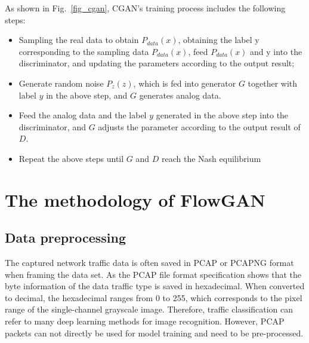 \documentclass[conference]{IEEEtran}
\begin{document}
As shown in Fig.~\ref{fig_cgan}, CGAN's training process includes the following steps:
\begin{itemize}
\item Sampling the real data to obtain $P_{data}(x)$, obtaining the label y corresponding to the sampling data $P_{data}(x)$, feed $P_{data}(x)$ and y into the discriminator, and updating the parameters according to the output result;
\item Generate random noise $P_z(z)$, which is fed into generator $G$ together with label $y$ in the above step, and $G$ generates analog data.
\item Feed the analog data and the label $y$ generated in the above step into the discriminator, and $G$ adjusts the parameter according to the output result of $D$.
\item Repeat the above steps until $G$ and $D$ reach the Nash equilibrium
\end{itemize}

\section{The methodology of FlowGAN}\label{algorithm}
\subsection{Data preprocessing}\label{data_preprocess}
The captured network traffic data is often saved in PCAP or PCAPNG format when framing the data set. As the PCAP file format specification shows that the byte information of the data traffic type is saved in hexadecimal. When converted to decimal, the hexadecimal ranges from 0 to 255, which corresponds to the pixel range of the single-channel grayscale image. Therefore, traffic classification can refer to many deep learning methods for image recognition. However, PCAP packets can not directly be used for model training and need to be pre-processed.
\end{document}
